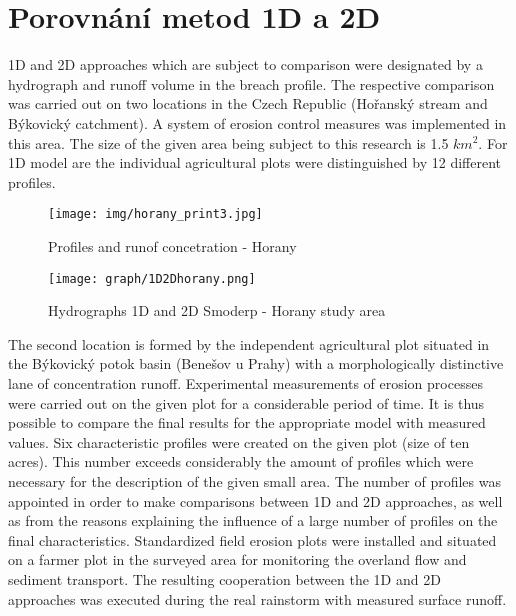 \setcounter{section}{0}
\section{Porovnání metod 1D a 2D} \label{porovnani1D2D}


1D and 2D approaches which are subject to comparison were designated by a hydrograph and runoff volume in the breach profile. The respective comparison was carried out on two locations in the Czech Republic (Hořanský stream and Býkovický catchment). A system of erosion control measures was implemented in this area. The size of the given area being subject to this research is 1.5 $ km^{2} $. For 1D model are the individual agricultural plots were distinguished by 12 different profiles.

\begin{figure}[ht!]
\centering
\texttt{[image: img/horany\_print3.jpg]}
\caption{Profiles and runof concetration - Horany}
\label{fig:horany}
\end{figure}\FloatBarrier

\begin{figure}[ht!]
\renewcommand{\figurename}{Graf}
\centering
\texttt{[image: graph/1D2Dhorany.png]}
\caption{Hydrographs 1D and 2D Smoderp - Horany study area}
\label{graf:graf_1}
\end{figure}\FloatBarrier

The second location is formed by the independent agricultural plot situated in the Býkovický potok basin (Benešov u Prahy) with a morphologically distinctive lane of concentration runoff. Experimental measurements of erosion processes were carried out on the given plot for a considerable period of time. It is thus possible to compare the final results for the appropriate model with measured values. Six characteristic profiles were created on the given plot (size of ten acres). This number exceeds considerably the amount of profiles which were necessary for the description of the given small area. The number of profiles was appointed in order to make comparisons between 1D and 2D approaches, as well as from the reasons explaining the influence of a large number of profiles on the final characteristics. Standardized field erosion plots were installed and situated on a farmer plot in the surveyed area for monitoring the overland flow and sediment transport. The resulting cooperation between the 1D and 2D approaches was executed during the real rainstorm with measured surface runoff.

